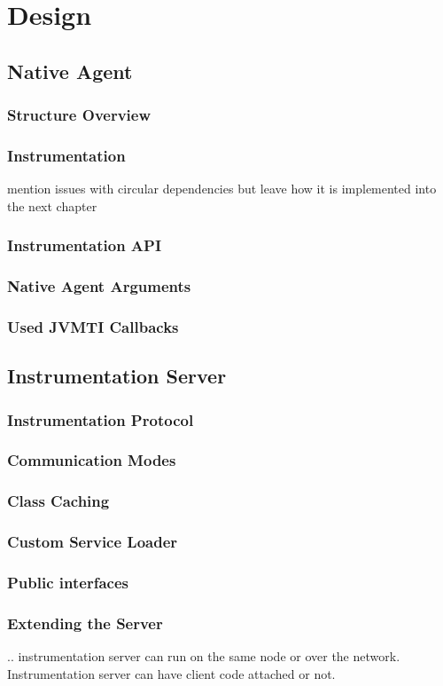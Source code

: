 \chapter{Design}
\section{Native Agent}
\subsection{Structure Overview}
\subsection{Instrumentation}
mention issues with circular dependencies but leave how it is implemented into the next chapter
\subsection{Instrumentation API}
\subsection{Native Agent Arguments}
\subsection{Used JVMTI Callbacks}
\section{Instrumentation Server}
\subsection{Instrumentation Protocol }
\subsection{Communication Modes}
\subsection{Class Caching}
\subsection{Custom Service Loader}
\subsection{Public interfaces}
\subsection{Extending the Server}
.. instrumentation server can run on the same node or over the network. Instrumentation server can have client code attached or not.
